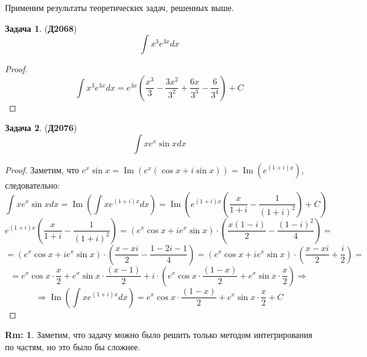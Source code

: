 \documentclass[12pt]{article}
\theoremstyle{definition}
\newtheorem{rem}{Rm:}
\newtheorem{problem}{Задача}
\DeclareMathOperator{\dint}{\displaystyle\int}
\DeclareMathOperator{\IM}{\operatorname{Im}}
\begin{document}
Применим результаты теоретических задач, решенных выше.
\begin{problem}(\textbf{Д2068})
	$$
		\dint x^3 e^{3x}dx
	$$
\end{problem}
\begin{proof}
	$$
		\dint x^3 e^{3x}dx = e^{3x}\left(\dfrac{x^3}{3} - \dfrac{3x^2}{3^2} + \dfrac{6x}{3^3} - \dfrac{6}{3^4}\right) + C
	$$
\end{proof}
\begin{problem}(\textbf{Д2076})
	$$
		\dint x e^x \sin{x} dx
	$$
\end{problem}
\begin{proof}
	Заметим, что $e^x \sin{x} = \IM{(e^x (\cos{x} + i\sin{x}))} = \IM(e^{(1 + i)x})$, следовательно:
	$$
		\dint x e^x \sin{x} dx = \IM\left(\dint x e^{(1 + i)x}dx\right) = \IM \left(e^{(1 + i)x} \left( \dfrac{x}{1 + i} - \dfrac{1}{(1 + i)^2}\right) + C\right)
	$$
	$$
		e^{(1 + i)x} \left( \dfrac{x}{1 + i} - \dfrac{1}{(1 + i)^2}\right) = (e^x\cos{x} + ie^{x}\sin{x}){\cdot}\left(\dfrac{x(1 - i)}{2} - \dfrac{(1-i)^2}{4}\right)= 
	$$
	$$
		=(e^x\cos{x} + ie^{x}\sin{x}){\cdot}\left( \dfrac{x - xi}{2} - \dfrac{1 - 2i -1}{4}\right) =(e^x\cos{x} + ie^{x}\sin{x}){\cdot}\left(\dfrac{x - xi}{2} + \dfrac{ i}{2}\right) = 
	$$
	$$
		 = e^x\cos{x}{\cdot}\dfrac{x}{2} + e^x \sin{x}{\cdot}\dfrac{(x-1)}{2}  +  i{\cdot}\left(e^x \cos{x}{\cdot}\dfrac{(1- x)}{2} + e^{x}\sin{x}{\cdot}\dfrac{x}{2} \right) \Rightarrow
	$$
	$$
		\Rightarrow \IM\left(\dint x e^{(1 + i)x}dx\right) = e^x \cos{x}{\cdot}\dfrac{(1- x)}{2} + e^{x}\sin{x}{\cdot}\dfrac{x}{2} + C
	$$	
\end{proof}
\begin{rem}
	Заметим, что задачу можно было решить только методом интегрирования по частям, но это было бы сложнее.
\end{rem}
\end{document}
